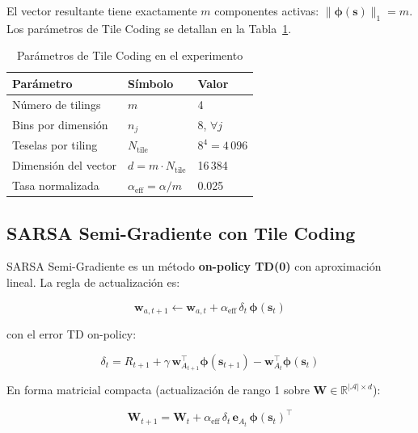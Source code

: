 El vector resultante tiene exactamente $m$ componentes activas: $\|\boldsymbol{\phi}(\mathbf{s})\|_1 = m$. Los parámetros de Tile Coding se detallan en la Tabla~\ref{tab:tilecoding}.

\begin{table}[htb!]
\caption{Parámetros de Tile Coding en el experimento}\label{tab:tilecoding}
\centering\small
\setlength{\tabcolsep}{4pt}
\begin{tabular}{@{}lll@{}}
\toprule
\textbf{Parámetro} & \textbf{Símbolo} & \textbf{Valor} \\
\midrule
Número de tilings & $m$ & 4 \\
Bins por dimensión & $n_j$ & 8, $\forall j$ \\
Teselas por tiling & $N_{\text{tile}}$ & $8^4 = 4\,096$ \\
Dimensión del vector & $d = m \cdot N_{\text{tile}}$ & 16\,384 \\
Tasa normalizada & $\alpha_{\text{eff}} = \alpha / m$ & 0.025 \\
\bottomrule
\end{tabular}
\end{table}

\subsection{SARSA Semi-Gradiente con Tile Coding}

SARSA Semi-Gradiente es un método \textbf{on-policy TD(0)} con aproximación lineal. La regla de actualización es:

\begin{equation}
  \mathbf{w}_{a,t+1} \leftarrow \mathbf{w}_{a,t} + \alpha_{\text{eff}}\,\delta_t\,\boldsymbol{\phi}(\mathbf{s}_t)
\end{equation}

con el error TD on-policy:

\begin{equation}
  \delta_t = R_{t+1} + \gamma\,\mathbf{w}_{A_{t+1}}^\top\boldsymbol{\phi}(\mathbf{s}_{t+1}) - \mathbf{w}_{A_t}^\top\boldsymbol{\phi}(\mathbf{s}_t)
\end{equation}

En forma matricial compacta (actualización de rango 1 sobre $\mathbf{W} \in \mathbb{R}^{|\mathcal{A}| \times d}$):

\begin{equation}
  \mathbf{W}_{t+1} = \mathbf{W}_t + \alpha_{\text{eff}}\,\delta_t\,\mathbf{e}_{A_t}\,\boldsymbol{\phi}(\mathbf{s}_t)^\top
\end{equation}

